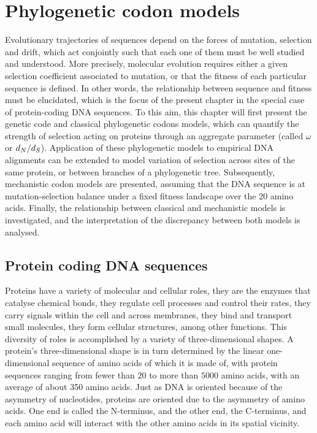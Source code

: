 \chapter{Phylogenetic {codon} models}
{\hypersetup{linkcolor=GREYDARK}\minitoc}
\label{chap:intro-codon-models}
Evolutionary trajectories of sequences depend on the forces of mutation, selection and drift, which act conjointly such that each one of them must be well studied and understood.
More precisely, molecular evolution requires either a given selection coefficient associated to mutation, or that the fitness of each particular sequence is defined.
In other words, the relationship between sequence and fitness must be elucidated, which is the focus of the present chapter in the special case of protein-coding \acrshort{DNA} sequences.
To this aim, this chapter will first present the genetic code and classical phylogenetic codons models, which can quantify the strength of selection acting on proteins through an aggregate parameter (called $\omega$ or $d_N / d_S$).
Application of these phylogenetic models to empirical \acrshort{DNA} alignments can be extended to model variation of selection across sites of the same protein, or between branches of a phylogenetic tree.
Subsequently, mechanistic codon models are presented, assuming that the DNA sequence is at mutation-selection balance under a fixed fitness landscape over the $20$ amino acids.
Finally, the relationship between classical and mechanistic models is investigated, and the interpretation of the discrepancy between both models is analysed.


\section{Protein coding {DNA} sequences}
\label{sec-intro:genetic-code}
Proteins have a variety of molecular and cellular roles, they are the enzymes that catalyse chemical bonds, they regulate cell processes and control their rates, they carry signals within the cell and across membranes, they bind and transport small molecules, they form cellular structures, among other functions.
This diversity of roles is accomplished by a variety of three-dimensional shapes.
A protein's three-dimensional shape is in turn determined by the linear one-dimensional sequence of amino acids of which it is made of, with protein sequences ranging from fewer than $20$ to more than $5000$ amino acids, with an average of about 350 amino acids.
Just as \acrshort{DNA} is oriented because of the asymmetry of nucleotides, proteins are oriented due to the asymmetry of amino acids.
One end is called the N-terminus, and the other end, the C-terminus, and each amino acid will interact with the other amino acids in its spatial vicinity.

